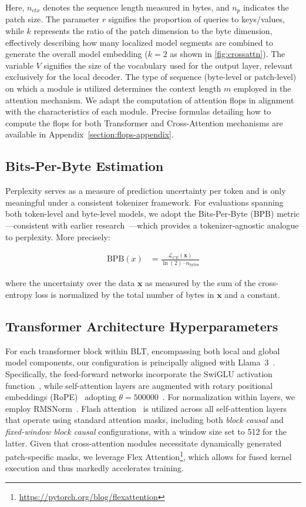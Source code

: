 Here, $n_{ctx}$ denotes the sequence length measured in bytes, and $n_p$ indicates the patch size. The parameter $r$ signifies the proportion of queries to keys/values, while $k$ represents the ratio of the patch dimension to the byte dimension, effectively describing how many localized model segments are combined to generate the overall model embedding ($k=2$ as shown in \autoref{fig:crossattn}). The variable $V$ signifies the size of the vocabulary used for the output layer, relevant exclusively for the local decoder. The type of sequence (byte-level or patch-level) on which a module is utilized determines the context length $m$ employed in the attention mechanism. We adapt the computation of attention flops in alignment with the characteristics of each module. Precise formulas detailing how to compute the flops for both Transformer and Cross-Attention mechanisms are available in Appendix~\ref{section:flops-appendix}.

\subsection{Bits-Per-Byte Estimation} Perplexity serves as a measure of prediction uncertainty per token and is only meaningful under a consistent tokenizer framework. For evaluations spanning both token-level and byte-level models, we adopt the Bits-Per-Byte (BPB) metric—consistent with earlier research~\citep{xue2022byt5, yu2023megabyte, wang2024mambabyte}—which provides a tokenizer-agnostic analogue to perplexity. More precisely:

\begin{align}
    \text{BPB}(x)&= \frac{\mathcal{L}_{CE}(\pmb{x})}{\ln(2)\cdot n_{\text{bytes}}}
\end{align}

where the uncertainty over the data $\pmb{x}$ as measured by the sum of the cross-entropy loss is normalized by the total number of bytes in $\pmb{x}$ and a constant. 

\subsection{Transformer Architecture Hyperparameters} 
For each transformer block within {\textsc BLT}, encompassing both local and global model components, our configuration is principally aligned with Llama~3~\citep{dubey2024llama}. Specifically, the feed-forward networks incorporate the SwiGLU activation function~\citep{swiglu}, while self-attention layers are augmented with rotary positional embeddings (RoPE)~\citep{RoPe} adopting $\theta=500000$~\citep{xiong2024effective}. For normalization within layers, we employ RMSNorm~\citep{RMSNorm}. Flash attention~\citep{dao2022flashattention} is utilized across all self-attention layers that operate using standard attention masks, including both \textit{block causal} and \textit{fixed-window block causal} configurations, with a window size set to 512 for the latter. Given that cross-attention modules necessitate dynamically generated patch-specific masks, we leverage Flex Attention\footnote{\url{https://pytorch.org/blog/flexattention}}, which allows for fused kernel execution and thus markedly accelerates training.

